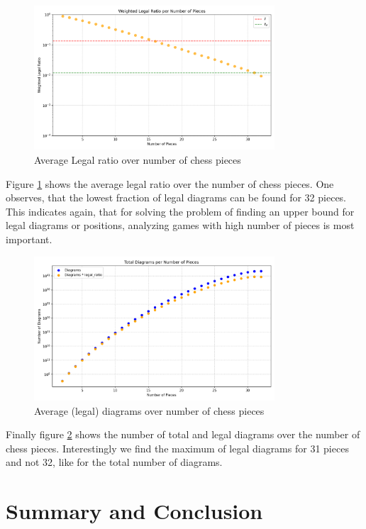 \documentclass[12pt]{article}
\begin{document}
\begin{figure}[h!]
  \centering
  \includegraphics[width=0.8\textwidth]{legal_ratio_per_num_pieces.png}
  \caption{Average Legal ratio over number of chess pieces}
  \label{fig:legal_ratio_by_pieces}
\end{figure}
Figure \ref{fig:legal_ratio_by_pieces} shows the average legal ratio over the number of chess pieces. One observes, that the lowest fraction of legal diagrams can be found for 32 pieces. This indicates again, that for solving the problem of finding an upper bound for legal diagrams or positions, analyzing games with high number of pieces is most important.
\begin{figure}[h!]
  \centering
  \includegraphics[width=0.8\textwidth]{diagrams_per_num_pieces.png}
  \caption{Average (legal) diagrams over number of chess pieces}
  \label{fig:diagrams_by_pieces}
\end{figure}

Finally figure \ref{fig:diagrams_by_pieces} shows the number of total and legal diagrams over the number of chess pieces. Interestingly we find the maximum of legal diagrams for 31 pieces and not 32, like for the total number of diagrams.

\section{Summary and Conclusion}
\end{document}

